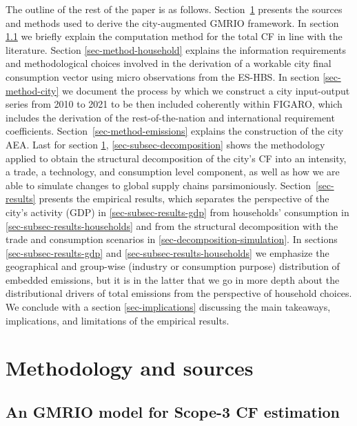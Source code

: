 \documentclass[
  10pt,
  twocolumn]{aft}
\begin{document}
The outline of the rest of the paper is as follows.
Section~\ref{sec-method} presents the sources and methods used to derive
the city-augmented GMRIO framework. In section \ref{sec-method-gmrio} we
briefly explain the computation method for the total CF in line with the
literature. Section \ref{sec-method-household} explains the information
requirements and methodological choices involved in the derivation of a
workable city final consumption vector using micro observations from the
ES-HBS. In section \ref{sec-method-city} we document the process by
which we construct a city input-output series from 2010 to 2021 to be
then included coherently within FIGARO, which includes the derivation of
the rest-of-the-nation and international requirement coefficients.
Section~\ref{sec-method-emissions} explains the construction of the city
AEA. Last for section \ref{sec-method}, \ref{sec-subsec-decomposition}
shows the methodology applied to obtain the structural decomposition of
the city's CF into an intensity, a trade, a technology, and consumption
level component, as well as how we are able to simulate changes to
global supply chains parsimoniously. Section~\ref{sec-results} presents
the empirical results, which separates the perspective of the city's
activity (GDP) in \ref{sec-subsec-results-gdp} from households'
consumption in \ref{sec-subsec-results-households} and from the
structural decomposition with the trade and consumption scenarios in
\ref{sec-decomposition-simulation}. In sections
\ref{sec-subsec-results-gdp} and \ref{sec-subsec-results-households} we
emphasize the geographical and group-wise (industry or consumption
purpose) distribution of embedded emissions, but it is in the latter
that we go in more depth about the distributional drivers of total
emissions from the perspective of household choices. We conclude with a
section \ref{sec-implications} discussing the main takeaways,
implications, and limitations of the empirical results.

\section{Methodology and sources}\label{sec-method}

\subsection{An GMRIO model for Scope-3 CF
estimation}\label{sec-method-gmrio}
\end{document}
